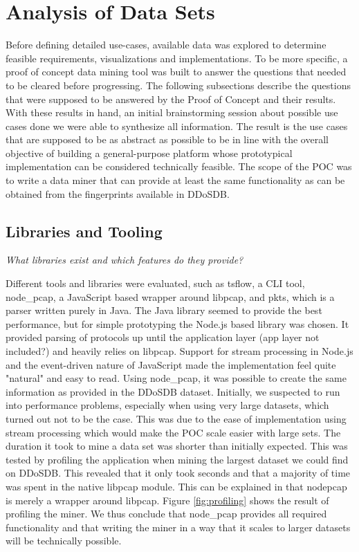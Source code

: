 \section{Analysis of Data Sets}
Before defining detailed use-cases, available data was explored to determine feasible requirements, visualizations and implementations. To be more specific, a proof of concept data mining tool was built to answer the questions that needed to be cleared before progressing. The following subsections describe the questions that were supposed to be answered by the Proof of Concept and their results. With these results in hand, an initial brainstorming session about possible use cases done we were able to synthesize all information. The result is the use cases that are supposed to be as abstract as possible to be in line with the overall objective of building a general-purpose platform whose prototypical implementation can be considered technically feasible.
The scope of the POC was to write a data miner that can provide at least the same functionality as can be obtained from the fingerprints available in DDoSDB.

\subsection{Libraries and Tooling}\label{librariesandtooling}

\textit{What libraries exist and which features do they provide?}   

   Different tools and libraries were evaluated, such as tsflow, a CLI tool, node\_pcap, a JavaScript based wrapper around libpcap, and pkts, which is a parser written purely in Java.
    The Java library seemed to provide the best performance, but for simple prototyping the Node.js based library was chosen. It provided parsing of protocols up until the application layer (app layer not included?) and heavily relies on libpcap. Support for stream processing in Node.js and the event-driven nature of JavaScript made the implementation feel quite "natural" and easy to read.
    Using node\_pcap, it was possible to create the same information as provided in the DDoSDB dataset. Initially, we suspected to run into performance problems, especially when using very large datasets, which turned out not to be the case. This was due to the ease of implementation using stream processing which would make the POC scale easier with large sets. The duration it took to mine a data set was shorter than initially expected. This was tested by profiling the application when mining the largest dataset we could find on DDoSDB. This revealed that it only took seconds and that a majority of time was spent in the native libpcap module. This can be explained in that node\-pcap is merely a wrapper around libpcap. Figure \ref{fig:profiling} shows the result of profiling the miner. We thus conclude that node\_pcap provides all required functionality and that writing the miner in a way that it scales to larger datasets will be technically possible.
    
